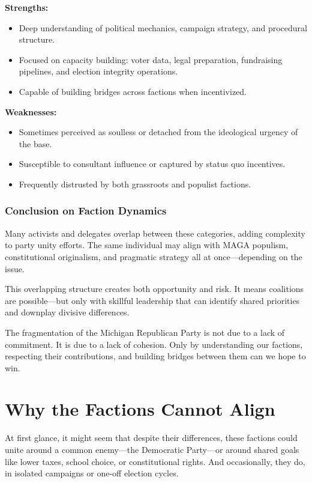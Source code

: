 \textbf{Strengths:}
\begin{itemize}
\item Deep understanding of political mechanics, campaign strategy, and procedural structure.
\item Focused on capacity building: voter data, legal preparation, fundraising pipelines, and election integrity operations.
\item Capable of building bridges across factions when incentivized.
\end{itemize}

\textbf{Weaknesses:}
\begin{itemize}
\item Sometimes perceived as soulless or detached from the ideological urgency of the base.
\item Susceptible to consultant influence or captured by status quo incentives.
\item Frequently distrusted by both grassroots and populist factions.
\end{itemize}

\subsection{Conclusion on Faction Dynamics}
Many activists and delegates overlap between these categories, adding complexity to party unity efforts. The same individual may align with MAGA populism, constitutional originalism, and pragmatic strategy all at once—depending on the issue.

This overlapping structure creates both opportunity and risk. It means coalitions are possible—but only with skillful leadership that can identify shared priorities and downplay divisive differences.

The fragmentation of the Michigan Republican Party is not due to a lack of commitment. It is due to a lack of cohesion. Only by understanding our factions, respecting their contributions, and building bridges between them can we hope to win.



\chapter{Why the Factions Cannot Align}

At first glance, it might seem that despite their differences, these factions could unite around a common enemy—the Democratic Party—or around shared goals like lower taxes, school choice, or constitutional rights. And occasionally, they do, in isolated campaigns or one-off election cycles.

